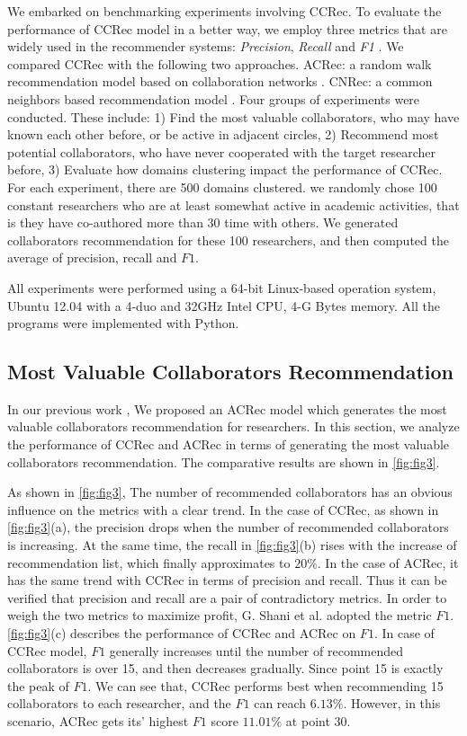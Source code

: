We embarked on benchmarking experiments involving CCRec. To evaluate the performance of CCRec model in a better way, we employ three metrics that are widely used in the recommender systems: \emph{Precision}, \emph{Recall} and \emph{F1} \cite{shani2011evaluating}. We compared CCRec with the following two approaches. ACRec: a random walk recommendation model based on collaboration networks \cite{li2014acrec}. CNRec: a common neighbors based recommendation model \cite{lopes2010collaboration}. Four groups of experiments were conducted. These include: 1) Find the most valuable collaborators, who may have known each other before, or be active in adjacent circles, 2) Recommend most potential collaborators, who have never cooperated with the target researcher before, 3) Evaluate how domains clustering impact the performance of CCRec. For each experiment, there are 500 domains clustered. we randomly chose 100 constant researchers who are at least somewhat active in academic activities, that is they have co-authored more than 30 time with others. We generated collaborators recommendation for these 100 researchers, and then computed the average of precision, recall and $F1$.


All experiments were performed using a 64-bit Linux-based operation system, Ubuntu 12.04 with a 4-duo and 32GHz Intel CPU, 4-G Bytes memory. All the programs were implemented with Python.

\subsection*{Most Valuable Collaborators Recommendation}
In our previous work \cite{li2014acrec}, We proposed an ACRec model which generates the most valuable collaborators recommendation for researchers. In this section, we analyze the performance of CCRec and ACRec in terms of generating the most valuable collaborators recommendation. The comparative results are shown in \autoref{fig:fig3}.

As shown in \autoref{fig:fig3}, The number of recommended collaborators has an obvious influence on the metrics with a clear trend. In the case of CCRec, as shown in \autoref{fig:fig3}(a), the precision drops when the number of recommended collaborators is increasing. At the same time, the recall in \autoref{fig:fig3}(b) rises with the increase of recommendation list, which finally approximates to $20\%$. In the case of ACRec, it has the same trend with CCRec in terms of precision and recall. Thus it can be verified that precision and recall are a pair of contradictory metrics. In order to weigh the two metrics to maximize profit, G. Shani et al. \cite{shani2011evaluating} adopted the metric $F1$. \autoref{fig:fig3}(c) describes the performance of CCRec and ACRec on $F1$. In case of CCRec model, $F1$ generally increases until the number of recommended collaborators is over 15, and then decreases gradually. Since point 15 is exactly the peak of $F1$. We can see that, CCRec performs best when recommending 15 collaborators to each researcher, and the $F1$ can reach $6.13\%$. However, in this scenario, ACRec gets its' highest $F1$ score $11.01\%$ at point 30.

